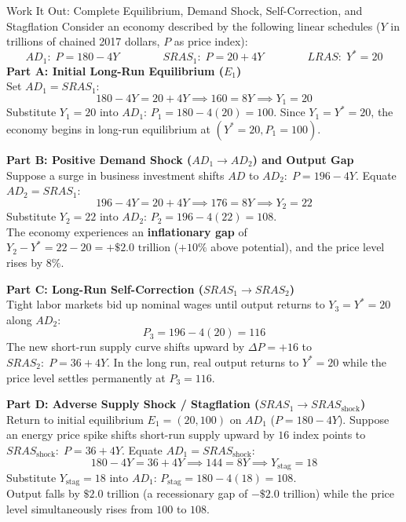 \documentclass[11pt,letterpaper]{article}
\begin{document}
\begin{examplecase}{Work It Out: Complete Equilibrium, Demand Shock, Self-Correction, and Stagflation}
Consider an economy described by the following linear schedules ($Y$ in trillions of chained 2017 dollars, $P$ as price index):
\[
AD_1: \; P = 180 - 4Y \qquad\qquad SRAS_1: \; P = 20 + 4Y \qquad\qquad LRAS: \; Y^* = 20
\]
\textbf{Part A: Initial Long-Run Equilibrium ($E_1$)} \\
Set $AD_1 = SRAS_1$:
\[
180 - 4Y = 20 + 4Y \implies 160 = 8Y \implies Y_1 = 20
\]
Substitute $Y_1 = 20$ into $AD_1$: $P_1 = 180 - 4(20) = 100$. Since $Y_1 = Y^* = 20$, the economy begins in long-run equilibrium at $(Y^* = 20, P_1 = 100)$.

\medskip
\noindent\textbf{Part B: Positive Demand Shock ($AD_1 \rightarrow AD_2$) and Output Gap} \\
Suppose a surge in business investment shifts $AD$ to $AD_2: \; P = 196 - 4Y$. Equate $AD_2 = SRAS_1$:
\[
196 - 4Y = 20 + 4Y \implies 176 = 8Y \implies Y_2 = 22
\]
Substitute $Y_2 = 22$ into $AD_2$: $P_2 = 196 - 4(22) = 108$. \\
The economy experiences an \textbf{inflationary gap} of $Y_2 - Y^* = 22 - 20 = +\$2.0\text{ trillion}$ ($+10\%$ above potential), and the price level rises by $8\%$.

\medskip
\noindent\textbf{Part C: Long-Run Self-Correction ($SRAS_1 \rightarrow SRAS_2$)} \\
Tight labor markets bid up nominal wages until output returns to $Y_3 = Y^* = 20$ along $AD_2$:
\[
P_3 = 196 - 4(20) = 116
\]
The new short-run supply curve shifts upward by $\Delta P = +16$ to $SRAS_2: \; P = 36 + 4Y$. In the long run, real output returns to $Y^* = 20$ while the price level settles permanently at $P_3 = 116$.

\medskip
\noindent\textbf{Part D: Adverse Supply Shock / Stagflation ($SRAS_1 \rightarrow SRAS_{\text{shock}}$)} \\
Return to initial equilibrium $E_1 = (20, 100)$ on $AD_1$ ($P = 180 - 4Y$). Suppose an energy price spike shifts short-run supply upward by $16$ index points to $SRAS_{\text{shock}}: \; P = 36 + 4Y$. Equate $AD_1 = SRAS_{\text{shock}}$:
\[
180 - 4Y = 36 + 4Y \implies 144 = 8Y \implies Y_{\text{stag}} = 18
\]
Substitute $Y_{\text{stag}} = 18$ into $AD_1$: $P_{\text{stag}} = 180 - 4(18) = 108$. \\
Output falls by $\$2.0\text{ trillion}$ (a recessionary gap of $-\$2.0\text{ trillion}$) while the price level simultaneously rises from $100$ to $108$.
\end{examplecase}
\end{document}
